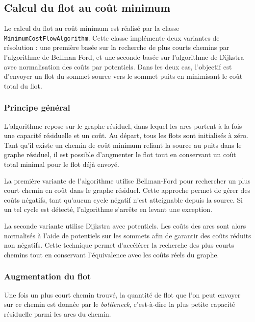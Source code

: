 \documentclass[titlepage]{article}
\begin{document}
\subsection{Calcul du flot au coût minimum}

Le calcul du flot au coût minimum est réalisé par la classe \texttt{MinimumCostFlowAlgorithm}. Cette classe implémente deux variantes de résolution : une première basée sur la recherche de plus courts chemins par l'algorithme de Bellman-Ford, et une seconde basée sur l'algorithme de Dijkstra avec normalisation des coûts par potentiels. Dans les deux cas, l'objectif est d'envoyer un flot du sommet source vers le sommet puits en minimisant le coût total du flot.

\subsubsection{Principe général}

L'algorithme repose sur le graphe résiduel, dans lequel les arcs portent à la fois une capacité résiduelle et un coût. Au départ, tous les flots sont initialisés à zéro. Tant qu'il existe un chemin de coût minimum reliant la source au puits dans le graphe résiduel, il est possible d'augmenter le flot tout en conservant un coût total minimal pour le flot déjà envoyé.

La première variante de l'algorithme utilise Bellman-Ford pour rechercher un plus court chemin en coût dans le graphe résiduel. Cette approche permet de gérer des coûts négatifs, tant qu'aucun cycle négatif n'est atteignable depuis la source. Si un tel cycle est détecté, l'algorithme s'arrête en levant une exception.

La seconde variante utilise Dijkstra avec potentiels. Les coûts des arcs sont alors normalisés à l'aide de potentiels sur les sommets afin de garantir des coûts réduits non négatifs. Cette technique permet d'accélérer la recherche des plus courts chemins tout en conservant l'équivalence avec les coûts réels du graphe.

\subsubsection{Augmentation du flot}

Une fois un plus court chemin trouvé, la quantité de flot que l'on peut envoyer sur ce chemin est donnée par le \emph{bottleneck}, c'est-à-dire la plus petite capacité résiduelle parmi les arcs du chemin.
\end{document}
